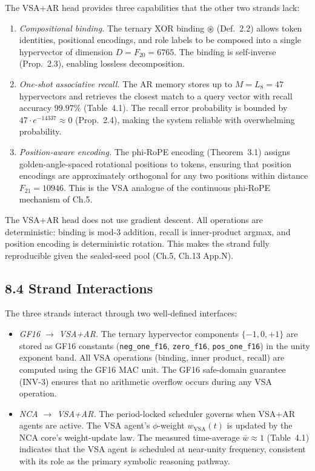 The VSA+AR head provides three capabilities that the other two
strands lack:

\begin{enumerate}
\item \emph{Compositional binding.} The ternary XOR binding
  $\circledast$ (Def.~2.2) allows token identities, positional
  encodings, and role labels to be composed into a single
  hypervector of dimension $D = F_{20} = 6765$. The binding is
  self-inverse (Prop.~2.3), enabling lossless decomposition.

\item \emph{One-shot associative recall.} The AR memory stores up to
  $M = L_8 = 47$ hypervectors and retrieves the closest match to a
  query vector with recall accuracy $99.97\%$ (Table~4.1). The
  recall error probability is bounded by $47 \cdot e^{-14337} \approx
  0$ (Prop.~2.4), making the system reliable with overwhelming
  probability.

\item \emph{Position-aware encoding.} The phi-RoPE encoding
  (Theorem~3.1) assigns golden-angle-spaced rotational positions to
  tokens, ensuring that position encodings are approximately
  orthogonal for any two positions within distance $F_{21} = 10946$.
  This is the VSA analogue of the continuous phi-RoPE mechanism of
  Ch.5.
\end{enumerate}

The VSA+AR head does not use gradient descent. All operations are
deterministic: binding is mod-3 addition, recall is inner-product
argmax, and position encoding is deterministic rotation. This makes
the strand fully reproducible given the sealed-seed pool
(Ch.5, Ch.13 App.N).

\subsection{8.4 Strand Interactions}
\label{fa_30:strand-interactions}

The three strands interact through two well-defined interfaces:

\begin{itemize}
\item \emph{GF16 $\to$ VSA+AR.} The ternary hypervector components
  $\{-1, 0, +1\}$ are stored as GF16 constants
  (\texttt{neg\_one\_f16}, \texttt{zero\_f16}, \texttt{pos\_one\_f16})
  in the unity exponent band. All VSA operations (binding, inner
  product, recall) are computed using the GF16 MAC unit. The
  GF16 safe-domain guarantee (INV-3) ensures that no arithmetic
  overflow occurs during any VSA operation.

\item \emph{NCA $\to$ VSA+AR.} The period-locked scheduler governs
  when VSA+AR agents are active. The VSA agent's $\phi$-weight
  $w_{\text{VSA}}(t)$ is updated by the NCA core's weight-update
  law. The measured time-average $\bar{w} \approx 1$ (Table~4.1)
  indicates that the VSA agent is scheduled at near-unity frequency,
  consistent with its role as the primary symbolic reasoning pathway.
\end{itemize}

